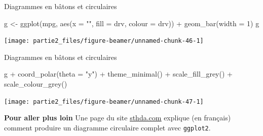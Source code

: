 \documentclass[12pt,ignorenonframetext,]{beamer}
\newenvironment{Shaded}{}{}
\newcommand{\DataTypeTok}[1]{#1}
\newcommand{\DecValTok}[1]{#1}
\newcommand{\KeywordTok}[1]{\textcolor[rgb]{0.00,0.00,1.00}{#1}}
\newcommand{\NormalTok}[1]{#1}
\newcommand{\OperatorTok}[1]{#1}
\newcommand{\StringTok}[1]{\textcolor[rgb]{0.00,0.50,0.50}{#1}}
\renewenvironment{Shaded}{\begin{snugshade}}{\end{snugshade}}
\newcommand{\intertitre}[1]{\textcolor{redInsee}{\textbf{#1}}}
\begin{document}
\begin{frame}[fragile]{Diagrammes en bâtons et circulaires}
\protect\hypertarget{diagrammes-en-batons-et-circulaires-6}{}

\footnotesize \center

\begin{Shaded}
\begin{Highlighting}[]
\NormalTok{g <-}\StringTok{ }\KeywordTok{ggplot}\NormalTok{(mpg, }\KeywordTok{aes}\NormalTok{(}\DataTypeTok{x =} \StringTok{""}\NormalTok{, }\DataTypeTok{fill =}\NormalTok{ drv, }\DataTypeTok{colour =}\NormalTok{ drv)) }\OperatorTok{+}\StringTok{ }
\StringTok{  }\KeywordTok{geom_bar}\NormalTok{(}\DataTypeTok{width =} \DecValTok{1}\NormalTok{)}
\NormalTok{g}
\end{Highlighting}
\end{Shaded}

\texttt{[image: partie2\_files/figure-beamer/unnamed-chunk-46-1]}

\end{frame}

\begin{frame}[fragile]{Diagrammes en bâtons et circulaires}
\protect\hypertarget{diagrammes-en-batons-et-circulaires-7}{}

\footnotesize \center

\begin{Shaded}
\begin{Highlighting}[]
\NormalTok{g }\OperatorTok{+}\StringTok{ }\KeywordTok{coord_polar}\NormalTok{(}\DataTypeTok{theta =} \StringTok{"y"}\NormalTok{) }\OperatorTok{+}\StringTok{ }\KeywordTok{theme_minimal}\NormalTok{() }\OperatorTok{+}
\StringTok{  }\KeywordTok{scale_fill_grey}\NormalTok{() }\OperatorTok{+}\StringTok{ }\KeywordTok{scale_colour_grey}\NormalTok{()}
\end{Highlighting}
\end{Shaded}

\texttt{[image: partie2\_files/figure-beamer/unnamed-chunk-47-1]}

\pause \raggedright \small

\intertitre{Pour aller plus loin} Une page du site
\href{http://www.sthda.com/french/wiki/ggplot2-graphique-en-camembert-guide-de-demarrage-rapide-logiciel-r-et-visualisation-de-donnees}{\underline{sthda.com}}
explique (en français) comment produire un diagramme circulaire complet
avec \texttt{ggplot2}.

\end{frame}
\end{document}
